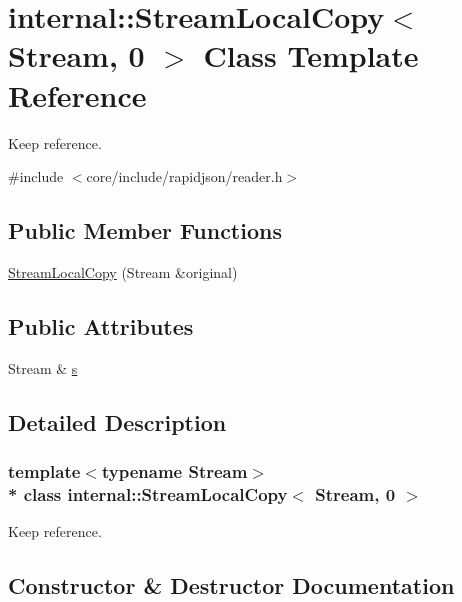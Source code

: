 \hypertarget{classinternal_1_1StreamLocalCopy_3_01Stream_00_010_01_4}{}\section{internal\+:\+:Stream\+Local\+Copy$<$ Stream, 0 $>$ Class Template Reference}
\label{classinternal_1_1StreamLocalCopy_3_01Stream_00_010_01_4}


Keep reference.  




{\ttfamily \#include $<$core/include/rapidjson/reader.\+h$>$}

\subsection*{Public Member Functions}
\begin{DoxyCompactItemize}
\item 
\hyperlink{classinternal_1_1StreamLocalCopy_3_01Stream_00_010_01_4_ac684a7be07d79d6ddd274dc1150f4b79}{Stream\+Local\+Copy} (Stream \&original)
\end{DoxyCompactItemize}
\subsection*{Public Attributes}
\begin{DoxyCompactItemize}
\item 
Stream \& \hyperlink{classinternal_1_1StreamLocalCopy_3_01Stream_00_010_01_4_ad31147888384f4bd51eabc2d7acdc4b6}{s}
\end{DoxyCompactItemize}


\subsection{Detailed Description}
\subsubsection*{template$<$typename Stream$>$\\*
class internal\+::\+Stream\+Local\+Copy$<$ Stream, 0 $>$}

Keep reference. 

\subsection{Constructor \& Destructor Documentation}
